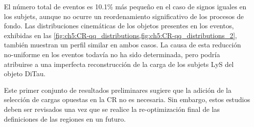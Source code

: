 El número total de eventos es 10.1\% más pequeño en el caso de signos iguales en los subjets, aunque no ocurre un reordenamiento significativo de los procesos de fondo. Las distribuciones cinemáticas de los objetos presentes en los eventos, exhibidas en las \cref{fig:ch5:CR-qq_distributions,fig:ch5:CR-qq_distributions_2}, también muestran un perfil similar en ambos casos. La causa de esta reducción no-uniforme en los eventos todavía no ha sido determinada, pero podría atribuirse a una imperfecta reconstrucción de la carga de los subjets LyS del objeto DiTau.

Este primer conjunto de resultados preliminares sugiere que la adición de la selección de cargas opuestas en la CR no es necesaria. Sin embargo, estos estudios deben ser revisados una vez que se realice la re-optimización final de las definiciones de las regiones en un futuro.

